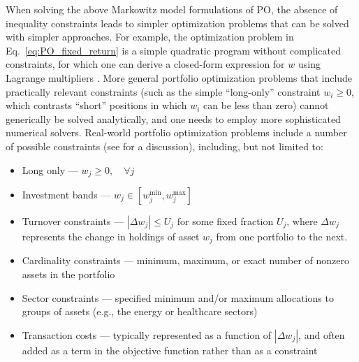 \begin{refsection}
When solving the above Markowitz model formulations of PO, the absence of inequality constraints leads to simpler optimization problems that can be solved with simpler approaches. For example, the optimization problem in Eq.~\eqref{eq:PO_fixed_return} is a simple quadratic program without complicated constraints, for which one can derive a closed-form expression for $w$ using Lagrange multipliers \cite{merton1972analytic}. More general portfolio optimization problems that include practically relevant constraints (such as the simple ``long-only'' constraint $w_i\geq 0$, which contrasts ``short'' positions in which $w_i$ can be less than zero) cannot generically be solved analytically, and one needs to employ more sophisticated numerical solvers.
Real-world portfolio optimization problems include a number of possible constraints (see \cite{MosekPortfolio2021} for a discussion), including, but not limited to:
\begin{itemize}
    \item Long only --- $w_j\geq 0, \quad \forall j$
    \item Investment bands --- $w_j\in [w_j^\text{min}, w_j^\text{max}]$
    \item Turnover constraints --- $|\Delta w_j|\leq U_j$ for some fixed fraction $U_j$, where $\Delta w_j$ represents the change in holdings of asset $w_j$ from one portfolio to the next.
    \item Cardinality constraints --- minimum, maximum, or exact number of nonzero assets in the portfolio
    \item Sector constraints --- specified minimum and/or maximum allocations to groups of assets (e.g., the energy or healthcare sectors)
    \item Transaction costs --- typically represented as a function of $|\Delta w_j|$, and often added as a term in the objective function rather than as a constraint
\end{itemize}

\end{refsection}
